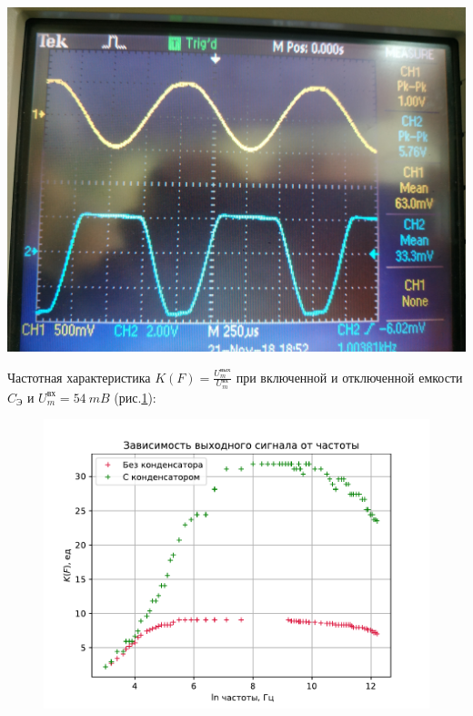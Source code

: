 \begin{center}
\begin{minipage}{0.3\linewidth}
        \vspace{-20pt}
        \label{fig:13}
    \end{minipage} 
\hfill     
    \begin{minipage}{0.3\linewidth}
        \centering
        \includegraphics[width=\linewidth]{fig/fig9iskajeniya}  
        \vspace{-20pt}
        \label{fig:14}
    \end{minipage} 
\end{center} 

Частотная характеристика $K(F)=\frac{U_m^{\text{вых}}}{U_m^{\text{вх}}}$ при включенной и отключенной емкости $C_{\text{Э}}$  и $U_m^{\text{вх}}= 54 ~mB$ (рис.\ref{fig:15}):
\begin{figure}[H]
	\centering
	\includegraphics[width=0.7\linewidth]{script/z251}
	\caption{}
	\label{fig:15}
\end{figure}

